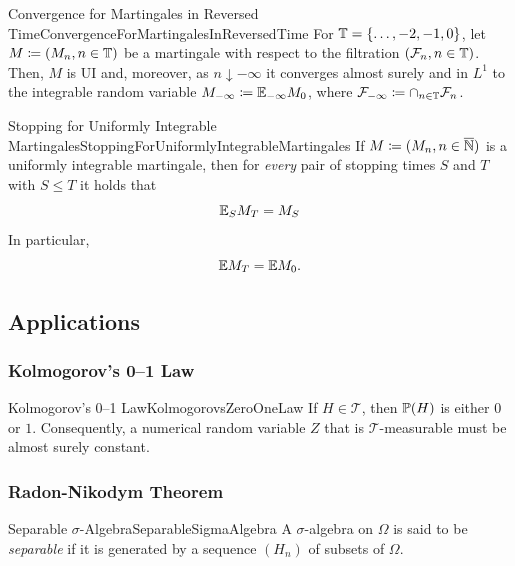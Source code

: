 \begin{thm}{Convergence for Martingales in Reversed Time}{ConvergenceForMartingalesInReversedTime}
	For $\mathbb{T} = \{\dots, -2, -1, 0\}$, let $M \coloneqq (M_n, n \in \mathbb{T})$ be a martingale with respect to the filtration $(\mathcal{F}_n, n \in \mathbb{T})$. Then, $M$ is UI and, moreover, as $n \downarrow -\infty$ it converges almost surely and in $L^1$ to the integrable random variable $M_{-\infty} \coloneqq \mathbb{E}_{-\infty} M_0$, where $\mathcal{F}_{-\infty} \coloneqq \cap_{n \in \mathbb{T}} \mathcal{F}_n$.
\end{thm}

\begin{thm}{Stopping for Uniformly Integrable Martingales}{StoppingForUniformlyIntegrableMartingales}
	If $M \coloneqq (M_n, n \in \overline{\mathbb{N}})$ is a uniformly integrable martingale, then for \emph{every} pair of stopping times $S$ and $T$ with $S \le T$ it holds that
	\begin{equation*}
		\mathbb{E}_S M_T = M_S
	\end{equation*}
	In particular,
	\begin{equation*}
		\mathbb{E} M_T = \mathbb{E} M_0.
	\end{equation*}
\end{thm}

\subsection{Applications}

\subsubsection{Kolmogorov's 0--1 Law}
\begin{thm}{Kolmogorov's 0--1 Law}{KolmogorovsZeroOneLaw}
	If $H \in \mathcal{T}$, then $\mathbb{P}(H)$ is either $0$ or $1$. Consequently, a numerical random variable $Z$ that is $\mathcal{T}$-measurable must be almost surely constant.
\end{thm}

\subsubsection{Radon-Nikodym Theorem}
\begin{defn}{Separable $\sigma$-Algebra}{SeparableSigmaAlgebra}
	A $\sigma$-algebra on $\Omega$ is said to be \emph{separable} if it is generated by a sequence $(H_n)$ of subsets of $\Omega$.
\end{defn}

